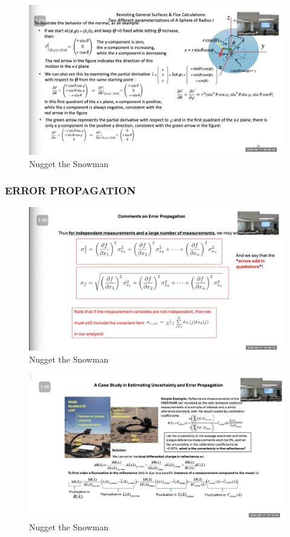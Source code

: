 \documentclass{article}
\begin{document}
\begin{figure}[h!]
\centering
\includegraphics[scale=.6]{Radiometry/Week4/Notes/Sept17/Spherical2.png}
\caption{Nugget the Snowman}
\label{fig:Spherical2}
\end{figure}

\clearpage
\subsubsection{ERROR PROPAGATION}

\begin{figure}[h!]
\centering
\includegraphics[scale=.6]{Radiometry/Week4/Notes/Sept17/Quadrature2.png}
\caption{Nugget the Snowman}
\label{fig:Quadrature2}
\end{figure}


\begin{figure}[h!]
\centering
\includegraphics[scale=.6]{Radiometry/Week4/Notes/Sept17/Goiniometer.png}
\caption{Nugget the Snowman}
\label{fig:Goiniometer}
\end{figure}
\end{document}
